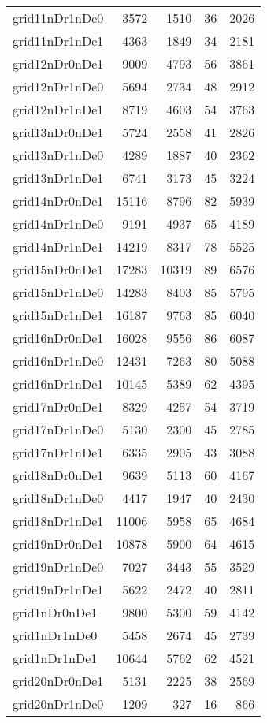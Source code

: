 \begin{longtable}{lrrrr}
grid11nDr1nDe0 & 3572 & 1510 & 36 & 2026 \\
grid11nDr1nDe1 & 4363 & 1849 & 34 & 2181 \\
grid12nDr0nDe1 & 9009 & 4793 & 56 & 3861 \\
grid12nDr1nDe0 & 5694 & 2734 & 48 & 2912 \\
grid12nDr1nDe1 & 8719 & 4603 & 54 & 3763 \\
grid13nDr0nDe1 & 5724 & 2558 & 41 & 2826 \\
grid13nDr1nDe0 & 4289 & 1887 & 40 & 2362 \\
grid13nDr1nDe1 & 6741 & 3173 & 45 & 3224 \\
grid14nDr0nDe1 & 15116 & 8796 & 82 & 5939 \\
grid14nDr1nDe0 & 9191 & 4937 & 65 & 4189 \\
grid14nDr1nDe1 & 14219 & 8317 & 78 & 5525 \\
grid15nDr0nDe1 & 17283 & 10319 & 89 & 6576 \\
grid15nDr1nDe0 & 14283 & 8403 & 85 & 5795 \\
grid15nDr1nDe1 & 16187 & 9763 & 85 & 6040 \\
grid16nDr0nDe1 & 16028 & 9556 & 86 & 6087 \\
grid16nDr1nDe0 & 12431 & 7263 & 80 & 5088 \\
grid16nDr1nDe1 & 10145 & 5389 & 62 & 4395 \\
grid17nDr0nDe1 & 8329 & 4257 & 54 & 3719 \\
grid17nDr1nDe0 & 5130 & 2300 & 45 & 2785 \\
grid17nDr1nDe1 & 6335 & 2905 & 43 & 3088 \\
grid18nDr0nDe1 & 9639 & 5113 & 60 & 4167 \\
grid18nDr1nDe0 & 4417 & 1947 & 40 & 2430 \\
grid18nDr1nDe1 & 11006 & 5958 & 65 & 4684 \\
grid19nDr0nDe1 & 10878 & 5900 & 64 & 4615 \\
grid19nDr1nDe0 & 7027 & 3443 & 55 & 3529 \\
grid19nDr1nDe1 & 5622 & 2472 & 40 & 2811 \\
grid1nDr0nDe1 & 9800 & 5300 & 59 & 4142 \\
grid1nDr1nDe0 & 5458 & 2674 & 45 & 2739 \\
grid1nDr1nDe1 & 10644 & 5762 & 62 & 4521 \\
grid20nDr0nDe1 & 5131 & 2225 & 38 & 2569 \\
grid20nDr1nDe0 & 1209 & 327 & 16 & 866 \\

\end{longtable}
